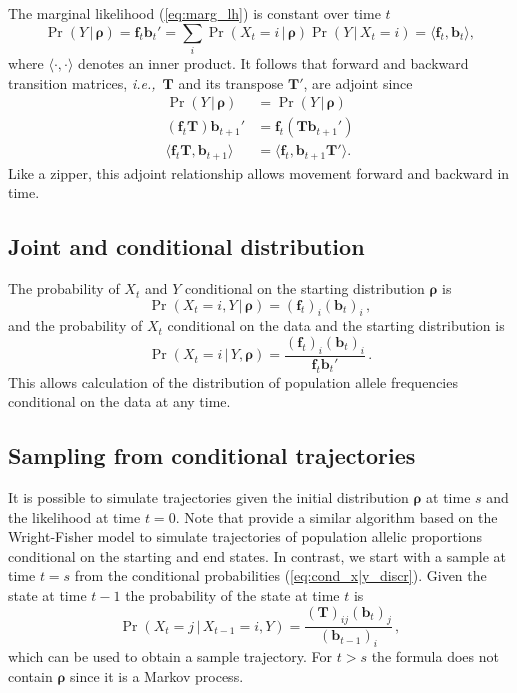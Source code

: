 \documentclass[preprint]{elsarticle}
\newcommand{\bs}[1]{\ensuremath{\boldsymbol{#1}}}
\newcommand\given{{\,|\,}}
\newcommand\ie{{\it i.e.,}}
\newcommand\x[1]{\ensuremath{X_{#1}}}
\newcommand\y{\ensuremath{Y}}
\newcommand\s{\ensuremath{s}}
\newcommand\fv[1]{\ensuremath{\mathbf{f}_{#1}}}
\newcommand\bv[1]{\ensuremath{\mathbf{b}_{#1}}}
\begin{document}
The marginal likelihood (\ref{eq:marg_lh}) is constant over time $t$ 
\begin{equation}
\Pr(\y \given \bs{\rho}) = \fv{t}\bv{t}' =\sum_i \Pr(\x{t}=i \given \bs{\rho}) \Pr(\y \given \x{t}=i) = \langle \fv{t}, \bv{t} \rangle,
\end{equation}
where $\langle \cdot , \cdot \rangle$ denotes an inner product.  It follows that forward and backward transition matrices, \ie\ $\mathbf{T}$ and its transpose $\mathbf{T}'$, are adjoint since
\begin{equation}\label{eq:adjoint_discrete}
\begin{split}
\Pr(\y \given \bs{\rho})              &= \Pr(\y \given \bs{\rho}) \\
(\fv{t}\mathbf{T})\bv{t+1}' &= \fv{t} (\mathbf{T}\bv{t+1}') \\
\langle \fv{t}\mathbf{T},\bv{t+1} \rangle   &= \langle  \fv{t},\bv{t+1}\mathbf{T}' \rangle.
\end{split}
\end{equation}
Like a zipper, this adjoint relationship allows movement forward and backward in time.

\subsection{Joint and conditional distribution}

The probability of $\x{t}$ and $\y$ conditional on the starting distribution $\bs{\rho}$ is
\begin{equation}\label{eq:joint_xy_discr}
\Pr(\x{t}=i,\y \given \bs{\rho}) = (\fv{t})_i (\bv{t})_i\,,
\end{equation}
and the probability of $\x{t}$ conditional on the data and the starting distribution is
\begin{equation}\label{eq:cond_x|y_discr}
\Pr(\x{t}=i \given \y,\bs{\rho}) = \frac{(\fv{t})_i (\bv{t})_i}{\fv{t}\bv{t}'}\,.
\end{equation}
This allows calculation of the distribution of population allele frequencies conditional on the data at any time. 

\subsection{Sampling from conditional trajectories}

It is possible to simulate trajectories given the initial distribution $\bs{\rho}$ at time $\s$ and the likelihood at time $t=0$. Note that \citet{Zhao14} provide a similar algorithm based on the Wright-Fisher model to simulate trajectories of population allelic proportions conditional on the starting and end states. In contrast, we start with a sample at time $t=\s$ from the conditional probabilities (\ref{eq:cond_x|y_discr}). Given the state at time $t-1$ the probability of the state at time $t$ is
\begin{equation}
    \Pr(\x{t}=j\given \x{t-1}=i,\y)=\frac{(\mathbf{T})_{ij}(\mathbf{b}_{t})_j}{(\mathbf{b}_{t-1})_i}\,,
\end{equation}
which can be used to obtain a sample trajectory. For $t>s$ the formula does not contain $\bs{\rho}$ since it is a Markov process.
\end{document}
